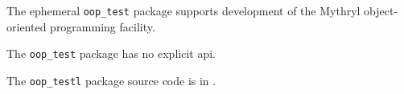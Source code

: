 
The ephemeral {\tt oop\_test} package supports development of the Mythryl 
object-oriented programming facility.

The {\tt oop\_test} package has no explicit api.

The {\tt oop\_testl} package source code is in .





